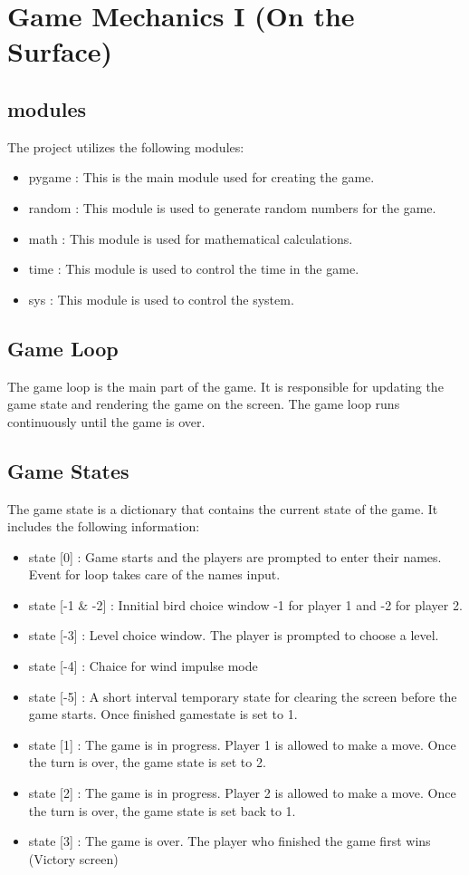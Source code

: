 \documentclass{article}
\begin{document}
    \section{Game Mechanics I (On the Surface)}
\subsection{modules}
The project utilizes the following modules:
\begin{itemize}
    \item pygame : This is the main module used for creating the game.
    \item random : This module is used to generate random numbers for the game.
    \item math : This module is used for mathematical calculations.
    \item time : This module is used to control the time in the game.
    \item sys : This module is used to control the system.
\end{itemize}

\subsection{Game Loop}
The game loop is the main part of the game. It is responsible for updating the game state and rendering the game on the screen. The game loop runs continuously until the game is over.


\subsection{Game States}
The game state is a dictionary that contains the current state of the game. It includes the following
information:
\begin{itemize}
    \item state [0] : Game starts and the players are prompted to enter their names. Event for loop takes care of the names input.
    \item state [-1 \& -2] : Innitial bird choice window -1 for player 1 and -2 for player 2.
    \item state [-3] : Level choice window. The player is prompted to choose a level.
    \item state [-4] : Chaice for wind impulse mode
    \item state [-5] : A short interval temporary state for clearing the screen before the game starts. Once finished gamestate is set to 1.
    \item state [1] : The game is in progress. Player 1 is allowed to make a move. Once the turn is over, the game state is set to 2.
    \item state [2] : The game is in progress. Player 2 is allowed to make a move. Once the turn is over, the game state is set back to 1.
    \item state [3] : The game is over. The player who finished the game first wins (Victory screen)
\end{itemize}
\pagebreak
\end{document}
